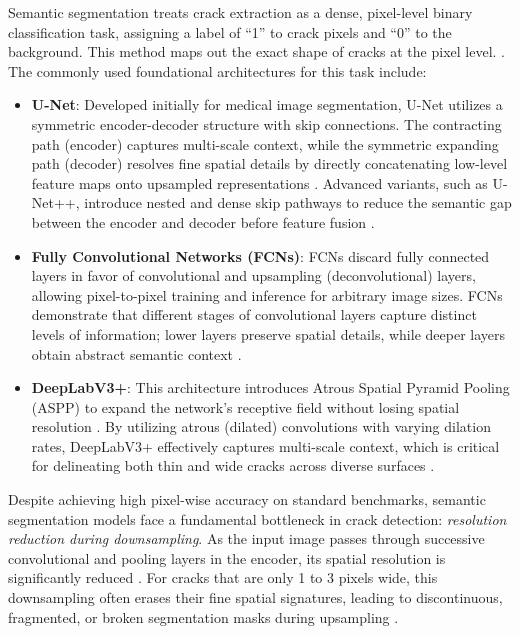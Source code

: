 \hs Semantic segmentation treats crack extraction as a dense, pixel-level binary classification task, assigning a label of ``1'' to crack pixels and ``0'' to the background. This method maps out the exact shape of cracks at the pixel level. \cite{liu-2019}. The commonly used foundational architectures for this task include:
\begin{itemize}
    
    \item \textbf{U-Net}: Developed initially for medical image segmentation, U-Net utilizes a symmetric encoder-decoder structure with skip connections. The contracting path (encoder) captures multi-scale context, while the symmetric expanding path (decoder) resolves fine spatial details by directly concatenating low-level feature maps onto upsampled representations \cite{liu-2019, kirchhoff-2024}. Advanced variants, such as U-Net++, introduce nested and dense skip pathways to reduce the semantic gap between the encoder and decoder before feature fusion \cite{pereira-2025}.
    
    \item \textbf{Fully Convolutional Networks (FCNs)}: FCNs discard fully connected layers in favor of convolutional and upsampling (deconvolutional) layers, allowing pixel-to-pixel training and inference for arbitrary image sizes. FCNs demonstrate that different stages of convolutional layers capture distinct levels of information; lower layers preserve spatial details, while deeper layers obtain abstract semantic context \cite{liu-2019}.
    
    \item \textbf{DeepLabV3+}: This architecture introduces Atrous Spatial Pyramid Pooling (ASPP) to expand the network's receptive field without losing spatial resolution \cite{goo-2025}. By utilizing atrous (dilated) convolutions with varying dilation rates, DeepLabV3+ effectively captures multi-scale context, which is critical for delineating both thin and wide cracks across diverse surfaces \cite{goo-2025,zhang-2024b}.

\end{itemize}

\hs Despite achieving high pixel-wise accuracy on standard benchmarks, semantic segmentation models face a fundamental bottleneck in crack detection: \textit{resolution reduction during downsampling}. As the input image passes through successive convolutional and pooling layers in the encoder, its spatial resolution is significantly reduced \cite{sohaib-2024}. For cracks that are only 1 to 3 pixels wide, this downsampling often erases their fine spatial signatures, leading to discontinuous, fragmented, or broken segmentation masks during upsampling \cite{zhang-2024b,zhang-2024c}.


